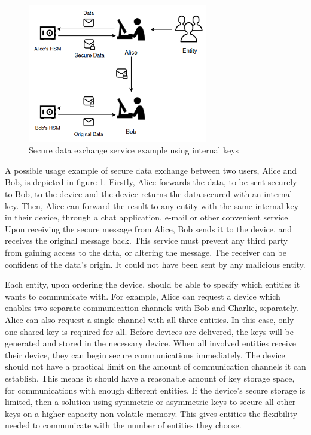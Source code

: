 \begin{figure}[h!]
    \centering
    \includegraphics[width=0.7\textwidth]{./Images/user-data-service.png}
    \caption{Secure data exchange service example using internal keys}
    \label{fig:user:data-service}
\end{figure}

A possible usage example of secure data exchange between two users, Alice and Bob, is depicted in figure \ref{fig:user:data-service}. Firstly, Alice forwards the data, to be sent securely to Bob, to the device and the device returns the data secured with an internal key. Then, Alice can forward the result to any entity with the same internal key in their device, through a chat application, e-mail or other convenient service.
Upon receiving the secure message from Alice, Bob sends it to the device, and receives the original message back.
This service must prevent any third party from gaining access to the data, or altering the message. The receiver can be confident of the data's origin. It could not have been sent by any malicious entity.

Each entity, upon ordering the device, should be able to specify which entities it wants to communicate with.
For example, Alice can request a device which enables two separate communication channels with Bob and Charlie, separately. Alice can also request a single channel with all three entities. In this case, only one shared key is required for all.
Before devices are delivered, the keys will be generated and stored in the necessary device. When all involved entities receive their device, they can begin secure communications immediately.
The device should not have a practical limit on the amount of communication channels it can establish. This means it should have a reasonable amount of key storage space, for communications with enough different entities.
If the device's secure storage is limited, then a solution using symmetric or asymmetric keys to secure all other keys on a higher capacity non-volatile memory.
This gives entities the flexibility needed to communicate with the number of entities they choose.

